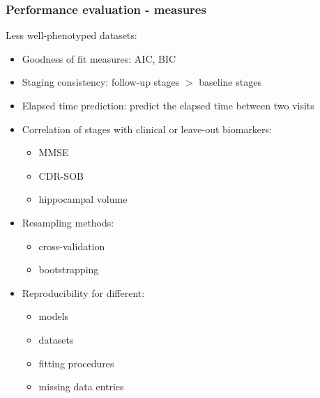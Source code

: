 \documentclass[10pt,xcolor=table]{beamer}
\begin{document}
\begin{frame}
\frametitle{Performance evaluation - measures}

Less well-phenotyped datasets:
\begin{itemize}
 \item \textcolor{parCol}{Goodness of fit measures: AIC, BIC}
 \item \textcolor{stCol}{Staging consistency: follow-up stages $>$ baseline stages}
 \item \textcolor{stCol}{Elapsed time prediction: predict the elapsed time between two visits}
 \item \textcolor{stCol}{Correlation of stages with clinical or leave-out biomarkers:}
   \begin{itemize}
   \item MMSE
   \item CDR-SOB
   \item hippocampal volume
  \end{itemize}
 \item \textcolor{bothCol}{Resampling methods:}
  \begin{itemize}
   \item cross-validation
   \item bootstrapping
  \end{itemize}
 \item \textcolor{bothCol}{Reproducibility for different}: 
 \begin{itemize}
   \item models
   \item datasets
   \item fitting procedures
   \item missing data entries
 \end{itemize}
  
\end{itemize}

\end{frame}
\end{document}
